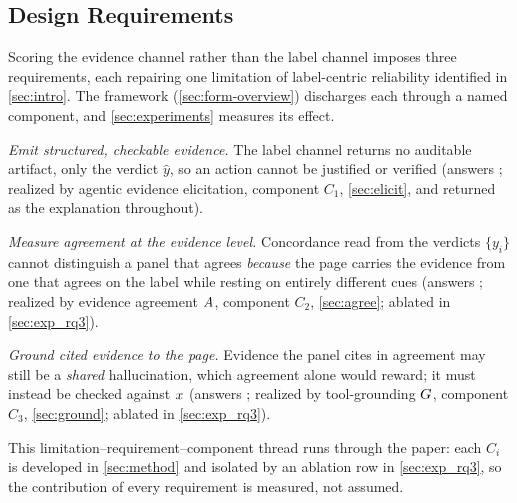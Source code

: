 \subsection{Design Requirements}
\label{sec:form-req}
Scoring the evidence channel rather than the label channel imposes three requirements,
each repairing one limitation of label-centric reliability identified in
\autoref{sec:intro}. The framework (\autoref{sec:form-overview}) discharges each
through a named component, and \autoref{sec:experiments} measures its effect.
\begin{compactitem}
\item[(\req{1})] \emph{Emit structured, checkable evidence.} The label channel returns
no auditable artifact, only the verdict $\hat y$, so an action cannot be justified or
verified (answers ; realized by agentic evidence elicitation, component $C_1$,
\autoref{sec:elicit}, and returned as the explanation throughout).
\item[(\req{2})] \emph{Measure agreement at the evidence level.} Concordance read from
the verdicts $\{y_i\}$ cannot distinguish a panel that agrees \emph{because} the page
carries the evidence from one that agrees on the label while resting on entirely
different cues (answers ; realized by evidence agreement $A$, component
$C_2$, \autoref{sec:agree}; ablated in \autoref{sec:exp_rq3}).
\item[(\req{3})] \emph{Ground cited evidence to the page.} Evidence the panel cites in
agreement may still be a \emph{shared} hallucination, which agreement alone would
reward; it must instead be checked against $x$ (answers ; realized by
tool-grounding $G$, component $C_3$, \autoref{sec:ground}; ablated in
\autoref{sec:exp_rq3}).
\end{compactitem}
This limitation--requirement--component thread runs through the paper: each $C_i$ is
developed in \autoref{sec:method} and isolated by an ablation row in
\autoref{sec:exp_rq3}, so the contribution of every requirement is measured, not
assumed.

